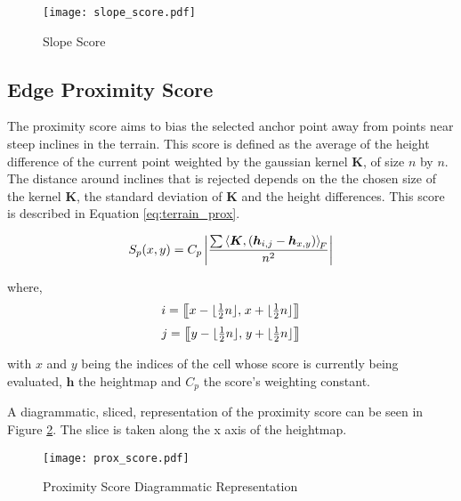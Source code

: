         \begin{figure}[h]
            \centering
            \texttt{[image: slope\_score.pdf]}
            \caption{Slope Score}
            \label{fig:slope_score}
        \end{figure}

    \subsection{Edge Proximity Score}
    The proximity score aims to bias the selected anchor point away from points near steep inclines in the terrain. This score is defined as the average of the height
    difference of the current point weighted by the gaussian kernel \(\boldsymbol{K}\), of size \(n\) by \(n\). The distance around inclines that is rejected depends on the the
    chosen size of the kernel \(\boldsymbol{K}\), the standard deviation of \(\boldsymbol{K}\) and the height differences. This score is described in Equation
    \ref{eq:terrain_prox}.

    \begin{equation} \label{eq:terrain_prox}
        S_p(x,y) = C_p\left|\frac{\sum\left\langle\boldsymbol{K},(\boldsymbol{h}_{i,j}-\boldsymbol{h}_{x,y})\right\rangle _{\mkern-3mu F}}{n^2}\right|
    \end{equation}

    \noindent
    where,
    \[i = \big[\mkern-4.7mu\big[x- \lfloor\tfrac{1}{2}n\rfloor,\mkern2mu x+\lfloor\tfrac{1}{2}n\rfloor\big]\mkern-4.7mu\big]\]
    \[j = \big[\mkern-4.7mu\big[y-\lfloor\tfrac{1}{2}n\rfloor,\mkern2mu y+ \lfloor\tfrac{1}{2}n\rfloor\big]\mkern-4.7mu\big]\]
    
    
    \noindent
    with \(x\) and \(y\) being the indices of the cell whose score is currently being evaluated, \(\boldsymbol{h}\) the
    heightmap and \(C_p\) the score's weighting constant.
    
    A diagrammatic, sliced, representation of the proximity score can be seen in Figure \ref{fig:prox_score_diagram}. The
    slice is taken along the x axis of the heightmap.

    \begin{figure}[h]
        \centering
        \texttt{[image: prox\_score.pdf]}
        \caption{Proximity Score Diagrammatic Representation}
        \label{fig:prox_score_diagram}
    \end{figure}


